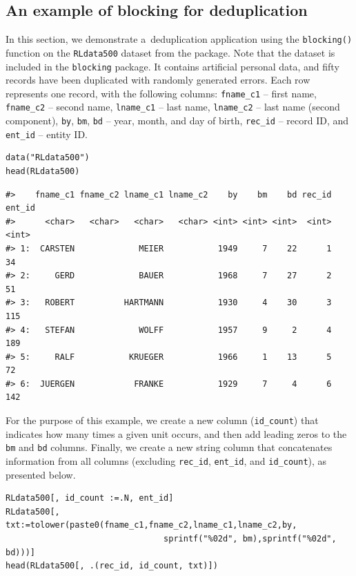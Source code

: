 \subsection{An example of blocking for deduplication}\label{an-example-of-blocking-for-deduplication}

In this section, we demonstrate a~deduplication application using the
\texttt{blocking()} function on the \texttt{RLdata500} dataset from the
 package. Note that the dataset is included in
the \texttt{blocking} package. It contains artificial personal data, and fifty
records have been duplicated with randomly generated errors. Each row
represents one record, with the following columns: \texttt{fname\_c1} -- first
name, \texttt{fname\_c2} -- second name, \texttt{lname\_c1} -- last name, \texttt{lname\_c2} --
last name (second component), \texttt{by}, \texttt{bm}, \texttt{bd} -- year, month, and day
of birth, \texttt{rec\_id} -- record ID, and \texttt{ent\_id} -- entity ID.

\begin{verbatim}
data("RLdata500")
head(RLdata500)
\end{verbatim}

\begin{verbatim}
#>    fname_c1 fname_c2 lname_c1 lname_c2    by    bm    bd rec_id ent_id
#>      <char>   <char>   <char>   <char> <int> <int> <int>  <int>  <int>
#> 1:  CARSTEN             MEIER           1949     7    22      1     34
#> 2:     GERD             BAUER           1968     7    27      2     51
#> 3:   ROBERT          HARTMANN           1930     4    30      3    115
#> 4:   STEFAN             WOLFF           1957     9     2      4    189
#> 5:     RALF           KRUEGER           1966     1    13      5     72
#> 6:  JUERGEN            FRANKE           1929     7     4      6    142
\end{verbatim}

For the purpose of this example, we create a new column (\texttt{id\_count})
that indicates how many times a given unit occurs, and then add leading
zeros to the \texttt{bm} and \texttt{bd} columns. Finally, we create a new string
column that concatenates information from all columns (excluding
\texttt{rec\_id}, \texttt{ent\_id}, and \texttt{id\_count}), as presented below.

\begin{verbatim}
RLdata500[, id_count :=.N, ent_id]
RLdata500[, txt:=tolower(paste0(fname_c1,fname_c2,lname_c1,lname_c2,by,
                                sprintf("%02d", bm),sprintf("%02d", bd)))]
head(RLdata500[, .(rec_id, id_count, txt)])
\end{verbatim}

